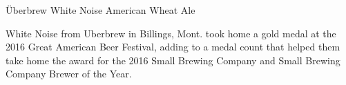 \begin{recipie}{Überbrew White Noise American Wheat Ale}

\begin{aboutblock}
White Noise from Uberbrew in Billings, Mont. took home a gold medal at the 2016
Great American Beer Festival, adding to a medal count that helped them take home
the award for the 2016 Small Brewing Company and Small Brewing Company Brewer of
the Year.
\end{aboutblock}


\begin{methodandtiming}
 
\begin{mashsteps}
\end{mashsteps}

\end{methodandtiming}

\pagebreak

\begin{ingredientsblock}

\begin{malts}
\end{malts}

\begin{hops}
\end{hops}

\begin{yeasts}
\end{yeasts}

\end{ingredientsblock}

\end{recipie}